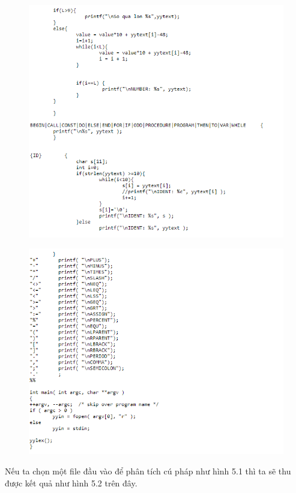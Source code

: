 \documentclass[14pt,a4paper]{extreport}
\begin{document}
\begin{figure}
	\centering
	\includegraphics[scale=1]{d2}
\end{figure}

\begin{figure}
	\centering
	\includegraphics[scale=1]{d3}
\end{figure}

\newpage
Nếu ta chọn một file đầu vào để phân tích cú pháp như hình 5.1 thì ta sẽ thu được kết quả như hình 5.2 trên đây.
\end{document}
